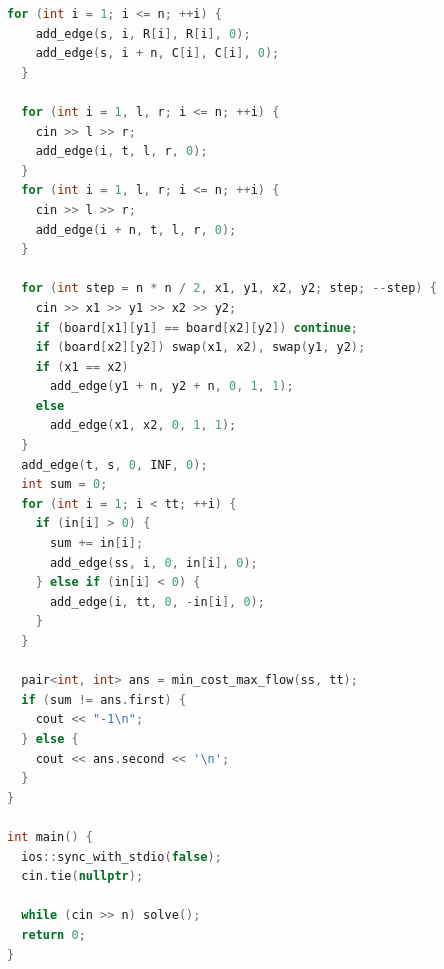 \documentclass[twoside]{article}
\begin{document}
\begin{lstlisting}[language=c++]
  for (int i = 1; i <= n; ++i) {
    add_edge(s, i, R[i], R[i], 0);
    add_edge(s, i + n, C[i], C[i], 0);
  }

  for (int i = 1, l, r; i <= n; ++i) {
    cin >> l >> r;
    add_edge(i, t, l, r, 0);
  }
  for (int i = 1, l, r; i <= n; ++i) {
    cin >> l >> r;
    add_edge(i + n, t, l, r, 0);
  }

  for (int step = n * n / 2, x1, y1, x2, y2; step; --step) {
    cin >> x1 >> y1 >> x2 >> y2;
    if (board[x1][y1] == board[x2][y2]) continue;
    if (board[x2][y2]) swap(x1, x2), swap(y1, y2);
    if (x1 == x2)
      add_edge(y1 + n, y2 + n, 0, 1, 1);
    else
      add_edge(x1, x2, 0, 1, 1);
  }
  add_edge(t, s, 0, INF, 0);
  int sum = 0;
  for (int i = 1; i < tt; ++i) {
    if (in[i] > 0) {
      sum += in[i];
      add_edge(ss, i, 0, in[i], 0);
    } else if (in[i] < 0) {
      add_edge(i, tt, 0, -in[i], 0);
    }
  }

  pair<int, int> ans = min_cost_max_flow(ss, tt);
  if (sum != ans.first) {
    cout << "-1\n";
  } else {
    cout << ans.second << '\n';
  }
}

int main() {
  ios::sync_with_stdio(false);
  cin.tie(nullptr);

  while (cin >> n) solve();
  return 0;
}

\end{lstlisting}
\end{document}

